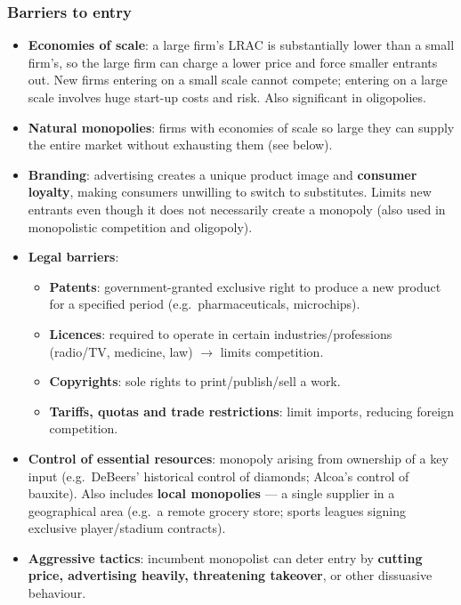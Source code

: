 \subsubsection*{Barriers to entry}
\begin{itemize}
  \item \textbf{Economies of scale}: a large firm's LRAC is substantially lower than a small firm's, so the large firm can charge a lower price and force smaller entrants out. New firms entering on a small scale cannot compete; entering on a large scale involves huge start-up costs and risk. Also significant in oligopolies.
  \item \textbf{Natural monopolies}: firms with economies of scale so large they can supply the entire market without exhausting them (see below).
  \item \textbf{Branding}: advertising creates a unique product image and \textbf{consumer loyalty}, making consumers unwilling to switch to substitutes. Limits new entrants even though it does not necessarily create a monopoly (also used in monopolistic competition and oligopoly).
  \item \textbf{Legal barriers}:
  \begin{itemize}
    \item \textbf{Patents}: government-granted exclusive right to produce a new product for a specified period (e.g.\ pharmaceuticals, microchips).
    \item \textbf{Licences}: required to operate in certain industries/professions (radio/TV, medicine, law) $\to$ limits competition.
    \item \textbf{Copyrights}: sole rights to print/publish/sell a work.
    \item \textbf{Tariffs, quotas and trade restrictions}: limit imports, reducing foreign competition.
  \end{itemize}
  \item \textbf{Control of essential resources}: monopoly arising from ownership of a key input (e.g.\ DeBeers' historical control of diamonds; Alcoa's control of bauxite). Also includes \textbf{local monopolies} --- a single supplier in a geographical area (e.g.\ a remote grocery store; sports leagues signing exclusive player/stadium contracts).
  \item \textbf{Aggressive tactics}: incumbent monopolist can deter entry by \textbf{cutting price, advertising heavily, threatening takeover}, or other dissuasive behaviour.
\end{itemize}
